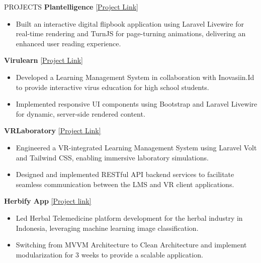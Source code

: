 \documentclass{resume} %
\begin{document}
\vspace{0.8em}
\begin{rSection}{PROJECTS}
 {\bf Plantelligence} \hfill \href{https://plantelligence.bio}{[Project Link]}
\vspace{-0.75em}
\begin{itemize}
\itemsep -7pt {} 
\item Built an interactive digital flipbook application using Laravel Livewire for real-time rendering and TurnJS for page-turning animations, delivering an enhanced user reading experience.
 \end{itemize}
 \vspace{-0.5em}
 
  {\bf Virulearn} \hfill \href{https://virulearn.com}{[Project Link]}
\vspace{-0.75em}
\begin{itemize}
\itemsep -7pt {} 
\item Developed a Learning Management System in collaboration with Inovasiin.Id to provide interactive virus education for high school students.
\item Implemented responsive UI components using Bootstrap and Laravel Livewire for dynamic, server-side rendered content.
 \end{itemize}
 \vspace{-0.5em}
 
{\bf VRLaboratory} \hfill \href{http://vrlaboratory.bio}{[Project Link]}
\vspace{-0.75em}
\begin{itemize}
\itemsep -7pt {}
\item Engineered a VR-integrated Learning Management System using Laravel Volt and Tailwind CSS, enabling immersive laboratory simulations.
\item Designed and implemented RESTful API backend services to facilitate seamless communication between the LMS and VR client applications.
\end{itemize}
\vspace{-0.5em}

{\bf Herbify App} \hfill \href{https://play.google.com/store/apps/details?id=com.herbify.herbifyapp&pcampaignid=web_share}{[Project link]}
\vspace{-0.75em}
\begin{itemize}
\itemsep -7pt {}
\item Led Herbal Telemedicine platform development for the herbal industry in Indonesia, leveraging machine learning image classification.
\item Switching from MVVM Architecture to Clean Architecture and implement modularization for 3 weeks to provide a scalable application.
 \end{itemize}
 \vspace{-0.5em}

\end{rSection} 
\end{document}
